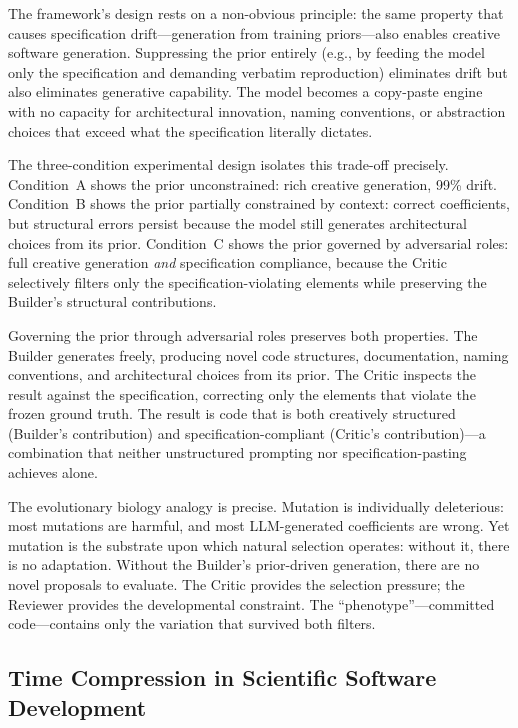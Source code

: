 \documentclass[11pt,a4paper]{article}
\begin{document}
The framework's design rests on a non-obvious principle: the same property that causes specification drift---generation from training priors---also enables creative software generation. Suppressing the prior entirely (e.g., by feeding the model only the specification and demanding verbatim reproduction) eliminates drift but also eliminates generative capability. The model becomes a copy-paste engine with no capacity for architectural innovation, naming conventions, or abstraction choices that exceed what the specification literally dictates.

The three-condition experimental design isolates this trade-off precisely. Condition~A shows the prior unconstrained: rich creative generation, 99\% drift. Condition~B shows the prior partially constrained by context: correct coefficients, but structural errors persist because the model still generates architectural choices from its prior. Condition~C shows the prior governed by adversarial roles: full creative generation \textit{and} specification compliance, because the Critic selectively filters only the specification-violating elements while preserving the Builder's structural contributions.

Governing the prior through adversarial roles preserves both properties. The Builder generates freely, producing novel code structures, documentation, naming conventions, and architectural choices from its prior. The Critic inspects the result against the specification, correcting only the elements that violate the frozen ground truth. The result is code that is both creatively structured (Builder's contribution) and specification-compliant (Critic's contribution)---a combination that neither unstructured prompting nor specification-pasting achieves alone.

The evolutionary biology analogy is precise. Mutation is individually deleterious: most mutations are harmful, and most LLM-generated coefficients are wrong. Yet mutation is the substrate upon which natural selection operates: without it, there is no adaptation. Without the Builder's prior-driven generation, there are no novel proposals to evaluate. The Critic provides the selection pressure; the Reviewer provides the developmental constraint. The ``phenotype''---committed code---contains only the variation that survived both filters.

\subsection{Time Compression in Scientific Software Development}
\end{document}
